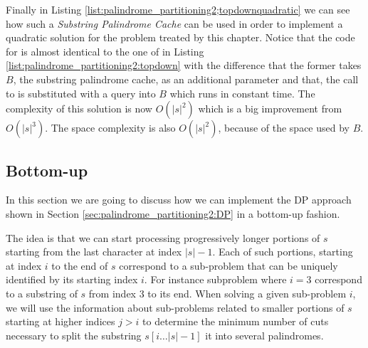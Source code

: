 Finally in Listing \ref{list:palindrome_partitioning2;topdownquadratic} we can see how such a
\textit{Substring Palindrome Cache} can be used in order to implement a quadratic solution for the
problem treated by this chapter. Notice that the code for
 is almost identical to the one of
 in Listing
\ref{list:palindrome_partitioning2:topdown} with the difference that the former takes $B$, the
substring palindrome cache, as an additional parameter and that, the call to 
is substituted with a query into $B$ which runs in constant time. The complexity of this solution is
now $O(|s|^2)$ which is a big improvement from $O(|s|^3)$. The space complexity is also $O(|s|^2)$,
because of the space used by $B$.





\subsection{Bottom-up}
In this section we are going to discuss how we can implement the DP approach shown in Section
\ref{sec:palindrome_partitioning2:DP} in a bottom-up fashion.

The idea is that we can start processing progressively longer portions of $s$ starting from the last
character at index $|s|-1$. Each of such portions, starting at index $i$ to the end of $s$
correspond to a sub-problem that can be uniquely identified by its starting index $i$. For instance
subproblem where  $i=3$ correspond to a substring of $s$ from index $3$ to its end. When solving a
given sub-problem $i$, we will use the information about sub-problems related to smaller portions of
$s$ starting at higher indices $j > i$  to determine the minimum number of cuts necessary to split
the substring $s[i \ldots |s|-1]$ it into several palindromes.

